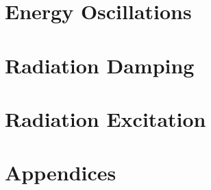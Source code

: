 \documentclass[ebook,a4paper,12pt,oneside,openany]{memoir}
\numberwithin{equation}{chapter}
\begin{document}
\chapter{Energy Oscillations} \label{ch:3}
    
    
    
    
    

\chapter{Radiation Damping} \label{ch:4}
    
    
    
    

\chapter{Radiation Excitation} \label{ch:5}
    
    
    
    
    
    
    
    

\chapter{Appendices} \label{ch:app}
    
    
    
    
    



\end{document}
